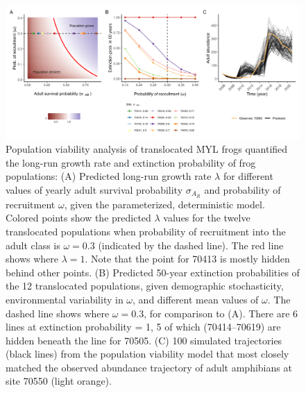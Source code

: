 \documentclass[9pt,twocolumn,twoside,lineno]{pnas-new}
\begin{document}
\begin{figure}

{\centering \includegraphics[width=\textwidth]{figures/pop_viability_figures_for_manuscript.jpg}

}

\caption{\label{fig-viability}Population viability analysis of
translocated MYL frogs quantified the long-run growth rate and
extinction probability of frog populations: (A) Predicted long-run
growth rate \(\lambda\) for different values of yearly adult survival
probability \(\sigma_{A_R}\) and probability of recruitment \(\omega\),
given the parameterized, deterministic model. Colored points show the
predicted \(\lambda\) values for the twelve translocated populations
when probability of recruitment into the adult class is \(\omega = 0.3\)
(indicated by the dashed line). The red line shows where
\(\lambda = 1\). Note that the point for 70413 is mostly hidden behind
other points. (B) Predicted 50-year extinction probabilities of the 12
translocated populations, given demographic stochasticity, environmental
variability in \(\omega\), and different mean values of \(\omega\). The
dashed line shows where \(\omega = 0.3\), for comparison to (A). There
are 6 lines at extinction probability = 1, 5 of which (70414--70619) are
hidden beneath the line for 70505. (C) 100 simulated trajectories (black
lines) from the population viability model that most closely matched the
observed abundance trajectory of adult amphibians at site 70550 (light
orange).}

\end{figure}

\newpage
\end{document}
